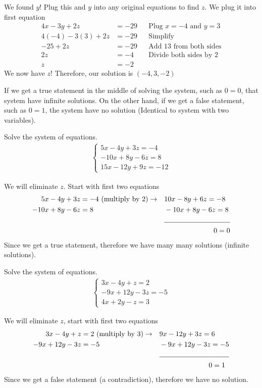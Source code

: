 We found $y$! Plug this and $y$ into any original equations to find $z$. We plug it into first equation
\begin{align*}
	4x-3y+2z&=-29 && \text{Plug $x=-4$ and $y=3$}\\
	4(-4)-3(3) + 2z&= -29 && \text{Simplify}\\
	 -25+2z &= -29 && \text{Add 13 from both sides}\\
	 2z &= -4 && \text{Divide both sides by 2}\\
	 z &= -2 &&
\end{align*}
We now have $z$! Therefore, our solution is $(-4,3,-2)$
\begin{note}
	If we get a true statement in the middle of solving the system, such as $0=0$, that system have infinite solutions. On the other hand, if we get a false statement, such as $0=1$, the system have no solution (Identical to system with two variables).
\end{note}
\begin{example}
		Solve the system of equations.
		\begin{align*}
		\begin{cases}
			5x-4y+3z=-4\\
			-10x+8y-6z=8\\
			15x-12y+9z=-12
		\end{cases}
	\end{align*}
\end{example}
We will eliminate $z$. Start with first two equations
\begin{align*}
		5x-4y+3z &=-4\,\, \text{(multiply by 2)} \rightarrow   && 10x-8y+6z=-8 \\
		-10x+8y-6z&=8  										   && -10x+8y-6z=8 \\
		&&&		\cline{1-2}
		&&& \qquad \qquad \qquad \quad  0=0
\end{align*}
Since we get a true statement, therefore we have many many solutions (infinite solutions).
\begin{example}
		Solve the system of equations.
		\begin{align*}
		\begin{cases}
			3x-4y+z=2\\
			-9x+12y-3z=-5\\
			4x+2y-z=3
		\end{cases}
	\end{align*}
\end{example}
We will eliminate $z$, start with first two equations
\begin{align*}
		3x-4y+z &=2\,\, \text{(multiply by 3)} \rightarrow   && 9x-12y+3z =6 \\
		-9x+12y-3z&=-5  										   && -9x+12y-3z=-5  \\
		&&&		\cline{1-2}
		&&& \qquad \qquad \qquad \quad  0=1
\end{align*}
Since we get a false statement (a contradiction), therefore we have no solution.